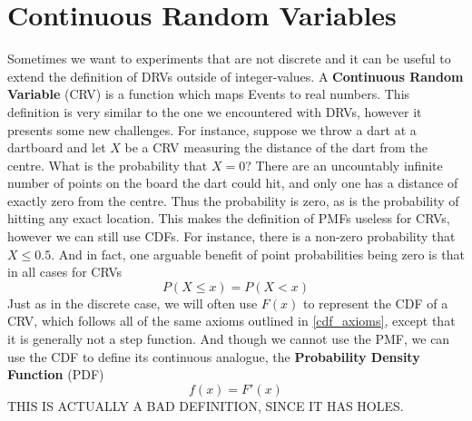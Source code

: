 \documentclass{report}
\begin{document}
\section{Continuous Random Variables}
Sometimes we want to experiments that are not discrete and it can be useful to extend the definition of DRVs outside of integer-values. A \textbf{Continuous Random Variable} (CRV) is a function which maps Events to real numbers. This definition is very similar to the one we encountered with DRVs, however it presents some new challenges. For instance, suppose we throw a dart at a dartboard and let $X$ be a CRV measuring the distance of the dart from the centre. What is the probability that $X=0$? There are an uncountably infinite number of points on the board the dart could hit, and only one has a distance of exactly zero from the centre. Thus the probability is zero, as is the probability of hitting any exact location. This makes the definition of PMFs useless for CRVs, however we can still use CDFs. For instance, there is a non-zero probability that $X\le 0.5$. And in fact, one arguable benefit of point probabilities being zero is that in all cases for CRVs
\[
    P(X\le x)= P(X< x)
\]
Just as in the discrete case, we will often use $F(x)$ to represent the CDF of a CRV, which follows all of the same axioms outlined in \ref{cdf_axioms}, except that it is generally not a step function. And though we cannot use the PMF, we can use the CDF to define its continuous analogue, the \textbf{Probability Density Function} (PDF)
\[
    f(x)=F'(x)
\]
\todo THIS IS ACTUALLY A BAD DEFINITION, SINCE IT HAS HOLES.
\end{document}
